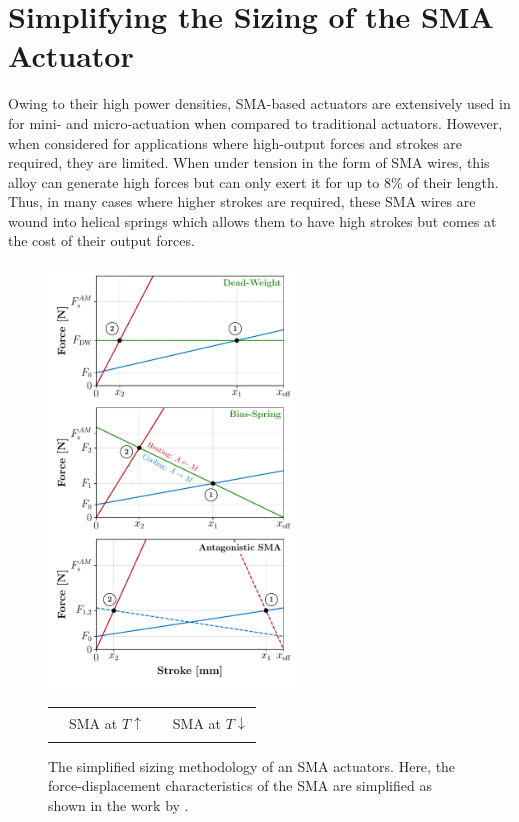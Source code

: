 \section{Simplifying the Sizing of the SMA Actuator}\label{sec:simplified-sma-model}
Owing to their high power densities, SMA-based actuators are extensively used in for mini- and micro-actuation when compared to traditional actuators. However, when considered for applications where high-output forces and strokes are required, they are limited. When under tension in the form of SMA wires, this alloy can generate high forces but can only exert it for up to 8\% of their length. Thus, in many cases where higher strokes are required, these SMA wires are wound into helical springs which allows them to have high strokes but comes at the cost of their output forces.

\begin{figure}[hbt!]
    \centering
    \includegraphics[width=0.6\textwidth]{images/chap2/simplied-sma-bias-all-wp.pdf}

    \begin{tabular}{l@{ }l l@{ }l}
      {\color{myred} \rule[2pt]{10pt}{0.5mm} } & {\footnotesize SMA at $T\uparrow$} & {\color{myblue} \rule[2pt]{10pt}{0.5mm} } & {\footnotesize SMA at $T\downarrow$}\\
    \end{tabular}
    \caption{The simplified sizing methodology of an SMA actuators. Here, the force-displacement characteristics of the SMA are simplified as shown in the work by \todocite.}
    \label{fig:simplied-sma-bias-spring-wp}
\end{figure}

